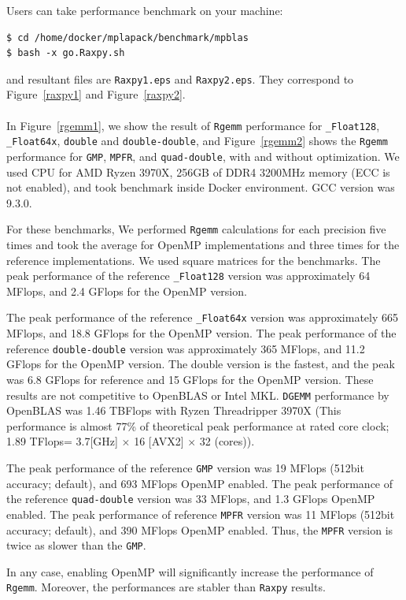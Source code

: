 \documentclass[12pt]{article}
\begin{document}
Users can take performance benchmark on your machine:
\begin{verbatim}
$ cd /home/docker/mplapack/benchmark/mpblas
$ bash -x go.Raxpy.sh
\end{verbatim}
and resultant files are {\tt Raxpy1.eps}  and {\tt Raxpy2.eps}. They correspond to Figure~\ref{raxpy1} and Figure~\ref{raxpy2}. 
\\
\\
In Figure~\ref{rgemm1}, we show the result of {\tt Rgemm} performance for {\tt \_Float128}, {\tt \_Float64x}, {\tt double} and  {\tt double-double}, and Figure~\ref{rgemm2} shows the {\tt Rgemm} performance for {\tt GMP}, {\tt MPFR}, and {\tt quad-double}, with and without optimization. We used CPU for AMD Ryzen 3970X, 256GB of DDR4 3200MHz memory (ECC is not enabled), and took benchmark inside Docker environment. GCC version was 9.3.0.

For these benchmarks, We performed {\tt Rgemm} calculations for each precision five times and took the average for OpenMP implementations and three times for the reference implementations. We used square matrices for the benchmarks.
The peak performance of the reference {\tt \_Float128} version was approximately 64 MFlops, and 2.4 GFlops for the OpenMP version. 

The peak performance of the reference {\tt \_Float64x} version
was approximately 665 MFlops, and 18.8 GFlops for the OpenMP version. The peak performance of the reference {\tt double-double} version was approximately 365 MFlops, and 11.2 GFlops for the OpenMP version. 
The double version is the fastest, and the peak was 6.8 GFlops for reference and 15 GFlops for the OpenMP version. These results are not competitive to OpenBLAS or Intel MKL. {\tt DGEMM} performance by OpenBLAS was 1.46 TBFlops with Ryzen Threadripper 3970X (This performance is almost 77\% of theoretical peak performance at rated core clock; 1.89 TFlops= 3.7[GHz] $\times$ 16 [AVX2] $\times$ 32 (cores)).

The peak performance of the reference {\tt GMP} version was 19 MFlops (512bit accuracy; default), and 693 MFlops OpenMP enabled.
The peak performance of the reference {\tt quad-double} version was 33 MFlops, and 1.3 GFlops OpenMP enabled.
The peak performance of reference {\tt MPFR} version was 11 MFlops (512bit accuracy; default), and 390 MFlops OpenMP enabled.
Thus, the {\tt MPFR} version is twice as slower than the {\tt GMP}.

In any case, enabling OpenMP will significantly increase the performance of {\tt Rgemm}. Moreover, the performances are stabler than {\tt Raxpy} results. 
\end{document}
